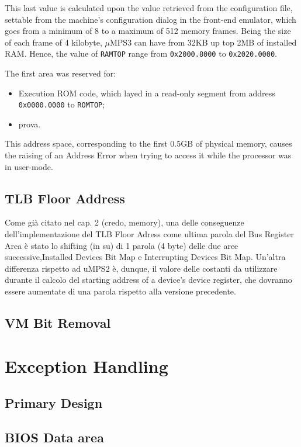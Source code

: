 \documentclass[12pt,a4paper,openright,twoside]{report}
\begin{document}
	This last value is calculated upon the value retrieved from the configuration file, settable from the machine's configuration dialog in the front-end emulator, which goes from a minimum of 8 to a maximum of 512 memory frames.
	Being the size of each frame of 4 kilobyte, $\mu$MPS3 can have from 32KB up top 2MB of installed RAM. Hence, the value of \texttt{RAMTOP} range from \texttt{0x2000.8000} to \texttt{0x2020.0000}.

	The first area was reserved for:
	\begin{itemize}  
	\item Execution ROM code, which layed in a read-only segment from address \texttt{0x0000.0000} to \texttt{ROMTOP};
	\item prova.
	\end{itemize}
	This address space, corresponding to the first 0.5GB of physical memory, causes the raising of an Address Error when trying to access it while the processor was in user-mode.
\section{TLB Floor Address}
Come già citato nel cap. 2 (credo, memory), una delle conseguenze dell'implementazione del TLB Floor Adress come ultima parola del Bus Register Area è stato lo shifting (in su) di 1 parola (4 byte) delle due aree successive,Installed Devices Bit Map e Interrupting Devices Bit Map.
	Un'altra differenza rispetto ad uMPS2 è, dunque, il valore delle costanti da utilizzare durante il calcolo del starting address of a device's device register, che dovranno essere aumentate di una parola rispetto alla versione precedente.
\section{VM Bit Removal}
\chapter{Exception Handling}
\lhead[\fancyplain{}{\bfseries\thepage}]{\fancyplain{}{\bfseries\rightmark}}
\section{Primary Design}
\section{BIOS Data area}
\lhead[\fancyplain{}{\bfseries\thepage}]{\fancyplain{}{\bfseries\rightmark}}
\end{document}
